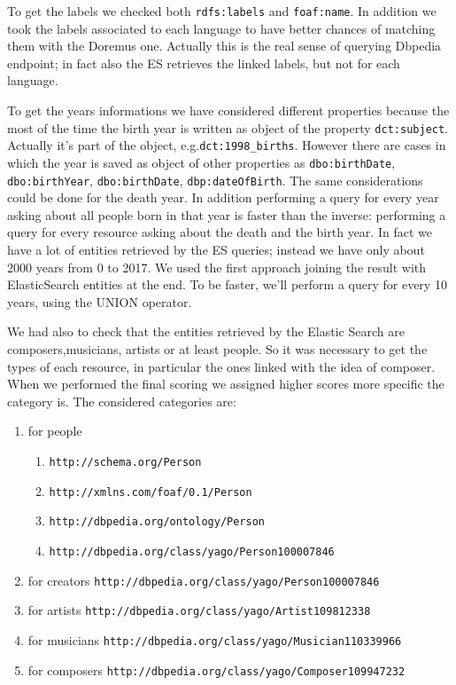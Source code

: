 \documentclass[paper=a4, fontsize=11pt]{scrartcl}
\begin{document}
To get the labels we checked both \verb|rdfs:labels| and \verb|foaf:name|. In addition we took the labels associated to each language to have better chances of matching them with the Doremus one. Actually this is the real sense of querying Dbpedia endpoint; in fact also the ES retrieves the linked labels, but not for each language.

To get the years informations we have considered different properties because the most of the time the birth year is written as object of the property \verb|dct:subject|. Actually it's part of the object, e.g.\verb|dct:1998_births|. However there are cases in which the year is saved as object of other properties as \verb|dbo:birthDate|, \verb|dbo:birthYear|,
\verb|dbo:birthDate|, \verb|dbp:dateOfBirth|.
The same considerations could be done for the death year. 
In addition performing a query for every year asking about all people born in that year is faster than the inverse: performing a query for every resource asking about the death and the birth year. In fact we have a lot of entities retrieved by the ES queries; instead we have only about 2000 years from 0 to 2017. We used the first approach joining the result with ElasticSearch entities at the end. 
To be faster, we'll perform a query for every 10 years, using the UNION operator. 

We had also to check that the entities retrieved by the Elastic Search are composers,musicians, artists or at least people. So it was necessary to get the types of each resource, in particular the ones linked with the idea of composer. When we performed the final scoring we assigned higher scores more specific the category is. 
The considered categories are:

\begin{enumerate}

\item for people \begin{enumerate} \item \verb|http://schema.org/Person| \item \verb|http://xmlns.com/foaf/0.1/Person|\item \verb|http://dbpedia.org/ontology/Person|\item \verb|http://dbpedia.org/class/yago/Person100007846| \end{enumerate}

\item for creators  \verb|http://dbpedia.org/class/yago/Person100007846| 

\item for artists \verb|http://dbpedia.org/class/yago/Artist109812338| 

\item for musicians \verb|http://dbpedia.org/class/yago/Musician110339966| 

\item for composers \verb|http://dbpedia.org/class/yago/Composer109947232| 

\end{enumerate}
\end{document}
